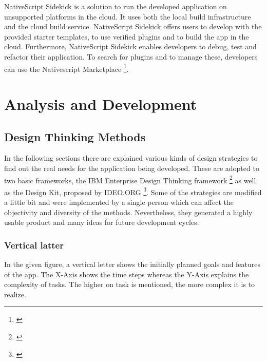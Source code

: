 NativeScript Sidekick is a solution to run the developed application on unsupported platforms in the cloud. It uses both the local build infrastructure and the cloud build service. NativeScript Sidekick offers users to develop with the provided starter templates, to use verified plugins and to build the app in the cloud. Furthermore, NativeScript Sidekick enables developers to debug, test and refactor their application. 
To search for plugins and to manage these, developers can use the Nativescript Marketplace \footnote{\cite{nsmarket}}.


\chapter{Analysis and Development}

\section{Design Thinking Methods}

In the following sections there are explained various kinds of design strategies to find out the real needs for the application being developed. These are adopted to two basic frameworks, the IBM Enterprise Design Thinking framework \footnote{\cite{ibm_edt}} as well as the Design Kit, proposed by IDEO.ORG \footnote{\cite{design_kit}}. Some of the strategies are modified a little bit and were implemented by a single person which can affect the objectivity and diversity of the methods. Nevertheless, they generated a highly usable product and many ideas for future development cycles. 

\subsection{Vertical latter}

In the given figure, a vertical letter shows the initially planned goals and features of the app. The X-Axis shows the time steps whereas the Y-Axis explains the complexity of tasks. The higher on task is mentioned, the more complex it is to realize.

